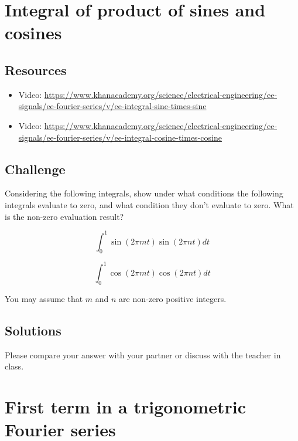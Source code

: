 \newpage

\section{Integral of product of sines and cosines}

\subsection*{Resources}
\begin{itemize}
    \item Video: \url{https://www.khanacademy.org/science/electrical-engineering/ee-signals/ee-fourier-series/v/ee-integral-sine-times-sine}
    \item Video: \url{https://www.khanacademy.org/science/electrical-engineering/ee-signals/ee-fourier-series/v/ee-integral-cosine-times-cosine}
\end{itemize}

\subsection*{Challenge}
Considering the following integrals, show under what conditions the following integrals evaluate to zero, and what condition they don't evaluate to zero. What is the non-zero evaluation result?

\begin{equation}
    \int_0^1 \sin(2 \pi m t) \sin(2 \pi n t) dt
\end{equation}

\begin{equation}
    \int_0^1 \cos(2 \pi m t) \cos(2 \pi n t) dt
\end{equation}

You may assume that $m$ and $n$ are non-zero positive integers.

\subsection*{Solutions}
Please compare your answer with your partner or discuss with the teacher in class.





\newpage
\section{First term in a trigonometric Fourier series}


